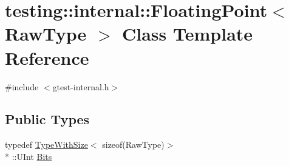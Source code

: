 \hypertarget{classtesting_1_1internal_1_1_floating_point}{\section{testing\+:\+:internal\+:\+:Floating\+Point$<$ Raw\+Type $>$ Class Template Reference}
\label{classtesting_1_1internal_1_1_floating_point}
}


{\ttfamily \#include $<$gtest-\/internal.\+h$>$}

\subsection*{Public Types}
\begin{DoxyCompactItemize}
\item 
typedef \hyperlink{classtesting_1_1internal_1_1_type_with_size}{Type\+With\+Size}$<$ sizeof(Raw\+Type)$>$\\*
\+::U\+Int \hyperlink{classtesting_1_1internal_1_1_floating_point_abf228bf6cd48f12c8b44c85b4971a731}{Bits}
\end{DoxyCompactItemize}
